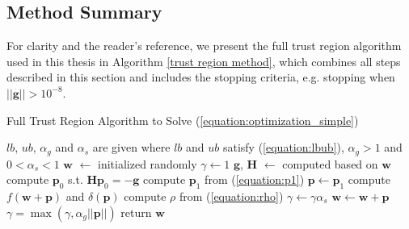 \documentclass[letterpaper,12pt,titlepage,oneside,final]{book}
\begin{document}
	\subsection{Method Summary}
	For clarity and the reader's reference, we present the full trust region algorithm used in this thesis in Algorithm \ref{trust region method}, which combines all steps described in this section and includes the stopping criteria, e.g. stopping when $||\mathbf{g}|| > 10^{-8}$.
	\begin{algorithm}
		\caption{Full Trust Region Algorithm to Solve (\ref{equation:optimization_simple})}\label{trust region method}
		\begin{algorithmic}[1]
			\State $lb$, $ub$, $\alpha_{g}$ and $\alpha_{s}$ are given where $lb$ and $ub$ satisfy (\ref{equation:lbub}), $\alpha_{g} > 1$ and $0 < \alpha_{s} < 1$
			\State $\mathbf{w}$ $\gets$ initialized randomly 
			\State $\gamma \gets 1$
			\State $\mathbf{g}$, $\mathbf{H}$ $\gets$ computed based on $\mathbf{w}$
			\State compute $\mathbf{p}_{0}$ s.t. $\mathbf{Hp}_{0} = -\mathbf{g}$
			\EndIf
			\State compute $\mathbf{p}_{1}$ from (\ref{equation:p1}) 
			\Else {}
			\State $\mathbf{p} \gets \mathbf{p}_{1}$
			\EndIf 
			\State compute $f(\mathbf{w} + \mathbf{p})$ and $\delta(\mathbf{p})$ 
			\State compute $\rho$ from (\ref{equation:rho})
			\State $\gamma \gets \gamma\alpha_{s}$
			\Else{}
			\State $\mathbf{w} \gets \mathbf{w} + \mathbf{p} $
			\State $\gamma = \max(\gamma,\alpha_{g}||\mathbf{p}||)$
			\EndIf
			\EndIf
			\EndWhile
			\State return $\mathbf{w}$
		\end{algorithmic}
	\end{algorithm}
	
	
\end{document}
